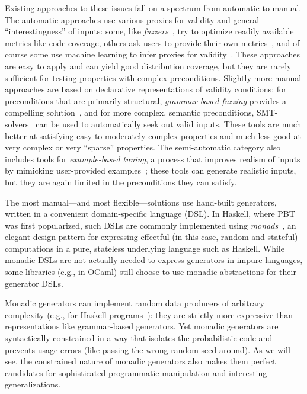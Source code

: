 
Existing approaches to these issues
fall on a spectrum from automatic to manual. The automatic approaches use
various proxies for validity and general ``interestingness'' of
inputs: some, like {\em
fuzzers}~\cite{afl-readme}, try to optimize readily available metrics like code
coverage, others ask users to provide their own metrics~\cite{loscher2017targetedpbt}, and
of course some use machine learning to infer proxies for
validity~\cite{godefroid2017learn, DBLP:conf/icse/ReddyLPS20}. These approaches
are easy to apply and can yield good distribution coverage, but they are rarely
sufficient for testing properties with complex preconditions. Slightly more
manual approaches are based on declarative representations of validity
conditions: for preconditions that are primarily structural, {\em grammar-based
fuzzing} provides a compelling solution~\cite{godefroid2008grammar,
holler2012fuzzing, veggalam2016ifuzzer, wang2019superion,
srivastava2021gramatron}, and for more complex, semantic preconditions,
SMT-solvers~\cite{dewey2017automated, LuckPOPL,
steinhofel2022input} can be used to automatically seek out valid
inputs. These tools are
much better at satisfying easy to moderately complex properties and
much less good at very complex or very ``sparse'' properties. The semi-automatic
category also includes tools for {\em example-based tuning}, a process that
improves realism of inputs by mimicking user-provided
examples~\cite{soremekun2020inputs}; these tools can generate
realistic inputs, but they are again limited in the preconditions they can
satisfy.

The most manual---and most flexible---solutions use hand-built
generators, written in a convenient domain-specific language (DSL).
In  Haskell, where PBT was
first popularized, such DSLs are commonly implemented using {\em
monads\/}~\cite{moggi1991notions}, an elegant design pattern for
expressing effectful (in this case, random and stateful) computations
in a pure, stateless underlying
language such as Haskell. While monadic DSLs are not actually
needed to express generators in
impure languages, some libraries (e.g., in OCaml) still choose to use monadic
abstractions for their generator DSLs.

Monadic generators can implement random data producers of arbitrary complexity
(e.g., for Haskell
programs~\cite{palka_testing_2011}): they are strictly more expressive than
representations like grammar-based generators.  Yet monadic generators are
syntactically constrained in a way that isolates the probabilistic code and
prevents usage errors (like passing the wrong random seed around). As we will
see, the constrained nature of monadic generators also makes them perfect
candidates for sophisticated programmatic manipulation and interesting
generalizations.

